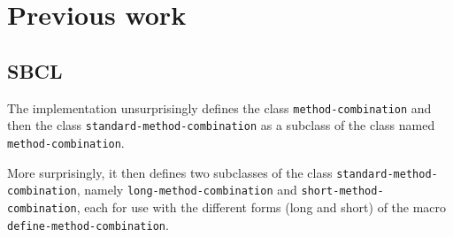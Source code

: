 \section{Previous work}

\subsection{SBCL}

The \sbcl{} \commonlisp{} implementation unsurprisingly defines the
class \texttt{method\--combination} and then the class
\texttt{standard\--method\--combination} as a subclass of
the class named \texttt{method\--combination}.

More surprisingly, it then defines two subclasses of the class
\texttt{standard\--method\--combination}, namely
\texttt{long\--method\--combination} and
\texttt{short\--method\--combination}, each for use with the different
forms (long and short) of the macro
\texttt{define\--method\--combination}.
